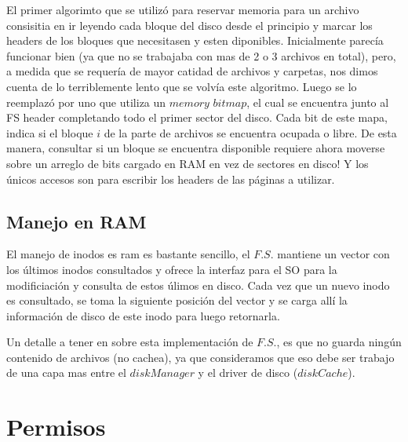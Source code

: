 \documentclass[english]{article}
\begin{document}
El primer algorimto que se utilizó para reservar memoria para un archivo
consisitia en ir leyendo cada bloque del disco desde el principio
y marcar los headers de los bloques que necesitasen y esten diponibles. 
Inicialmente parecía funcionar bien (ya que no se trabajaba con mas de 2 o 3
 archivos en total), pero, a medida que se requería de mayor catidad de 
archivos y carpetas, nos dimos cuenta de lo terriblemente
lento que se volvía este algoritmo. Luego se lo reemplazó por uno
que utiliza un $memory$ $bitmap$, el cual se encuentra junto al
FS header completando todo el primer sector del disco. Cada bit de este
mapa, indica si el bloque $i$ de la parte de archivos se encuentra
ocupada o libre. De esta manera, consultar si un bloque se encuentra disponible 
requiere ahora moverse sobre un arreglo de bits cargado en RAM en vez de 
sectores en disco! Y los únicos accesos son para escribir los headers de las 
páginas a utilizar.


\subsection{Manejo en RAM}

El manejo de inodos es ram es bastante sencillo, el $F.S.$ mantiene
un vector con los últimos inodos consultados y ofrece la interfaz
para el SO para la modificiación y consulta de estos úlimos en disco.
Cada vez que un nuevo inodo es consultado, se toma la siguiente posición
del vector y se carga allí la información de disco de este inodo para
luego retornarla.

Un detalle a tener en sobre esta implementación de $F.S.$, es que
no guarda ningún contenido de archivos (no cachea), ya que consideramos
que eso debe ser trabajo de una capa mas entre el $diskManager$ y
el driver de disco ($diskCache$).

\pagebreak{}

\section{Permisos}
\end{document}

